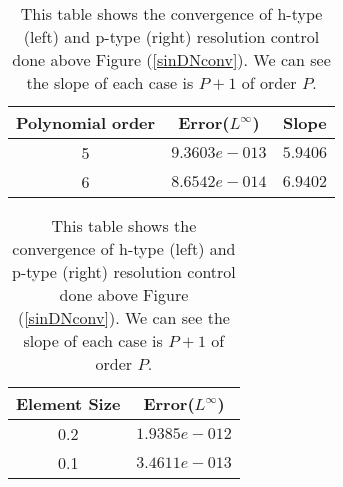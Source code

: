 \begin{table}[h]
\centering \caption{\label{hconv2t} This table shows the
convergence of h-type (left) and p-type (right) resolution control
done above Figure (\ref{sinDNconv}). We can see the slope of each
case is $P+1$ of order $P$. }
\begin{tabular}{|c|c|c|} \hline
    Polynomial order&Error($L^{\infty}$)&Slope   \\ \hline \hline
    5&$9.3603e-013$ &$5.9406$ \\ \hline
    6&$8.6542e-014$ &$6.9402$ \\ \hline
\end{tabular}
\hspace{.5in}
\begin{tabular}{|c|c|} \hline
    Element Size&Error($L^{\infty}$)\\ \hline
    0.2&$1.9385e-012$  \\ \hline
    0.1&$3.4611e-013$  \\ \hline
\end{tabular}

\end{table}

